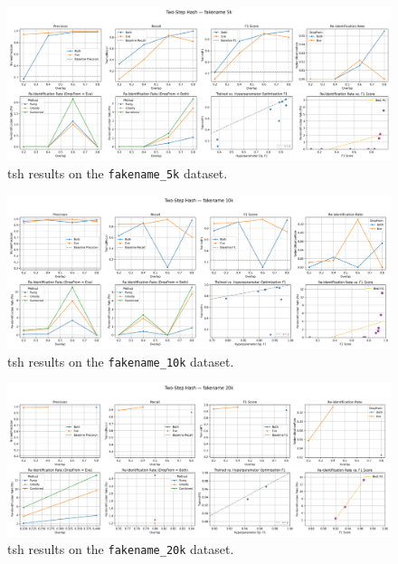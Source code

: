 \begin{figure}[H]
    \centering
    \includegraphics[width=\textwidth]{figures/TwoStepHash_fakename_5k_metrics.png}
    \caption{\ac{tsh} results on the \texttt{fakename\_5k} dataset.}
    \label{fig:twostep_fakename5k}
\end{figure}

\begin{figure}[H]
    \centering
    \includegraphics[width=\textwidth]{figures/TwoStepHash_fakename_10k_metrics.png}
    \caption{\ac{tsh} results on the \texttt{fakename\_10k} dataset.}
    \label{fig:twostep_fakename10k}
\end{figure}

\begin{figure}[H]
    \centering
    \includegraphics[width=\textwidth]{figures/TwoStepHash_fakename_20k_metrics.png}
    \caption{\ac{tsh} results on the \texttt{fakename\_20k} dataset.}
    \label{fig:twostep_fakename20k}
\end{figure}

